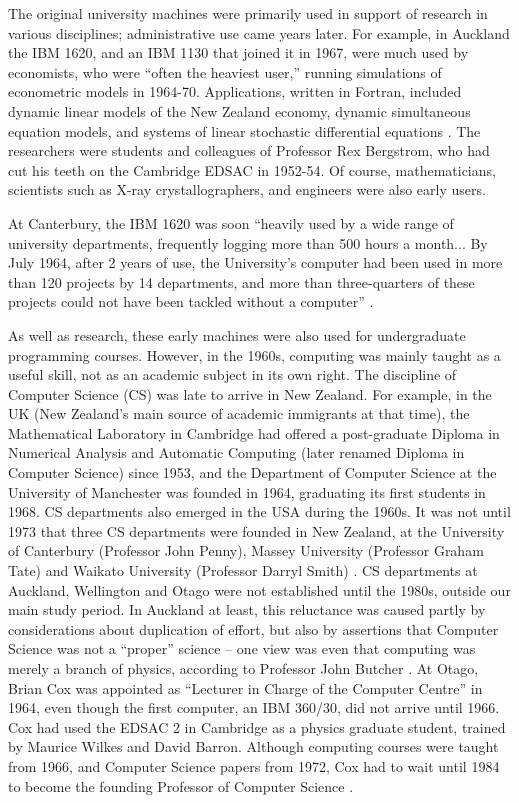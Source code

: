 \documentclass{IEEEcsmag}
\begin{document}
The original university machines were primarily used in support of research in various disciplines; administrative use came years later. For example, in Auckland the IBM 1620, and an IBM 1130 that joined it in 1967, were much used by economists, who were “often the heaviest user,” running simulations of econometric models in 1964-70. Applications, written in Fortran, included dynamic linear models of the New Zealand economy, dynamic simultaneous equation models, and systems of linear stochastic differential equations \cite{Phillips-UoA}. The researchers were students and colleagues of Professor Rex Bergstrom, who had cut his teeth on the Cambridge EDSAC in 1952-54. Of course, mathematicians, scientists such as X-ray crystallographers, and engineers were also early users.

At Canterbury, the IBM 1620 was soon “heavily used by a wide range of university departments, frequently logging more than 500 hours a month... By July
1964, after 2 years of use, the University’s computer had been used in more than 120 projects by 14 departments,
and more than three-quarters of these projects could not have been tackled without a computer” \cite{Dale-Canty2}.

As well as research, these early machines were also used for undergraduate programming courses. However, in the 1960s, computing was mainly taught as a useful skill, not as an academic subject in its own right. The discipline of Computer Science (CS) was late to arrive in New Zealand. For example, in the UK (New Zealand’s main source of academic immigrants at that time), the Mathematical Laboratory in Cambridge had offered a post-graduate Diploma in Numerical Analysis and Automatic Computing (later renamed Diploma in Computer Science) since 1953, and the Department of Computer Science at the University of Manchester was founded in 1964, graduating its first students in 1968. CS departments also emerged in the USA during the 1960s. It was not until 1973 that three CS departments were founded in New Zealand, at the University of Canterbury (Professor John Penny),  Massey University (Professor Graham Tate) and Waikato University (Professor Darryl Smith) \cite{Bell, Waikato-50}.
CS departments at Auckland, Wellington and Otago were not established until the 1980s, outside our main study period. In Auckland at least, this reluctance was caused partly by considerations about duplication of effort, but also by assertions that Computer Science was not a “proper” science -- one view was even that computing was merely a branch of physics, according to Professor John Butcher \cite{Butcher-private}. At Otago, Brian Cox was appointed as “Lecturer in Charge of the Computer Centre” in 1964, even though the first computer, an IBM 360/30, did not arrive until 1966. Cox had used the EDSAC 2 in Cambridge as a physics graduate student, trained by Maurice Wilkes and David Barron. Although computing courses were taught from 1966, and Computer Science papers from 1972, Cox had to wait until 1984 to become the founding Professor of Computer Science \cite{Otago-history}.
\cbstart
\vspace*{-8pt}
\end{document}
